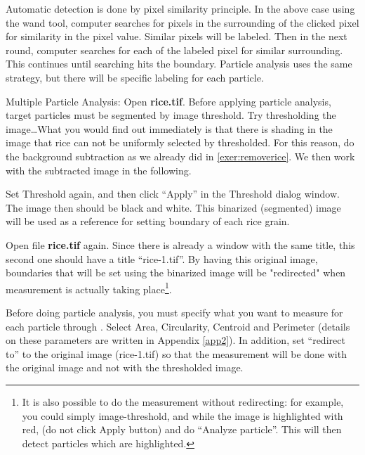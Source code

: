 Automatic detection is done by pixel similarity principle. In the above
case using the wand tool, computer searches for pixels in the
surrounding of the clicked pixel for similarity in the pixel value.
Similar pixels will be labeled. Then in the next round, computer
searches for each of the labeled pixel for similar surrounding. This
continues until searching hits the boundary. Particle analysis uses the
same strategy, but there will be specific labeling for each particle.

\begin{indentexercise}{2}
\item Multiple Particle Analysis: Open \textbf{rice.tif}. Before applying particle analysis, target
particles must be segmented by image threshold. Try thresholding the
image\ldots What you would find out immediately is that there is shading in
the image that rice can not be uniformly selected by thresholded. For this reason, do the
background subtraction as we already did in \ref{exer:removerice}. 
We then work with the subtracted image in the
following.

Set Threshold again, and then click ``Apply'' in the Threshold dialog window. 
The image then should be black and white. This binarized (segmented) image 
will be used as a reference for setting boundary of each rice grain. 

Open file \textbf{rice.tif} again. Since there is already a window with the same title, this second one 
should have a title ``rice-1.tif''. By having this original image, boundaries that will be set using the binarized image 
will be "redirected" when measurement is actually taking place\footnote{ It is also possible to 
do the measurement without redirecting: for example, you could simply image-threshold, and while the image is highlighted with red, (do not click Apply button) and do ``Analyze particle''. This will then detect particles which are highlighted.}. 

Before doing particle analysis, you must specify what you want to
measure for each particle through . Select Area, Circularity, Centroid and Perimeter
(details on these parameters are written in Appendix \ref{app2}).
In addition, set ``redirect to'' to the original image (rice-1.tif) so
that the measurement will be done with the original image and not with 
the thresholded image. 


\end{indentexercise}
